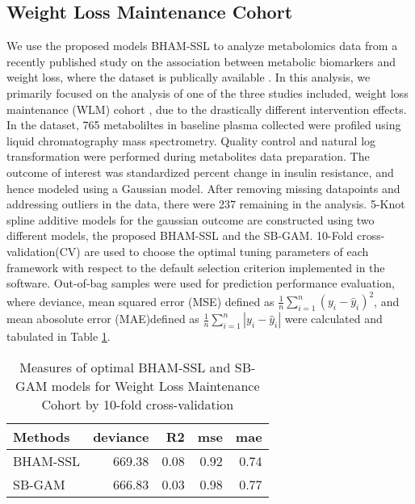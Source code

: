 \documentclass[AMA,STIX1COL,]{WileyNJD-v2}
\begin{document}
\hypertarget{weight-loss-maintenance-cohort}{%
\subsection{Weight Loss Maintenance
Cohort}\label{weight-loss-maintenance-cohort}}

We use the proposed models BHAM-SSL to analyze metabolomics data from a
recently published study \citep{Bihlmeyer2021} on the association
between metabolic biomarkers and weight loss, where the dataset is
publically available \citep{Bihlmeyer2021_data}. In this analysis, we
primarily focused on the analysis of one of the three studies included,
weight loss maintenance (WLM) cohort \citep{Svetkey2008}, due to the
drastically different intervention effects. In the dataset, 765
metaboliltes in baseline plasma collected were profiled using liquid
chromatography mass spectrometry. Quality control and natural log
transformation were performed during metabolites data preparation. The
outcome of interest was standardized percent change in insulin
resistance, and hence modeled using a Gaussian model. After removing
missing datapoints and addressing outliers in the data, there were 237
remaining in the analysis. 5-Knot spline additive models for the
gaussian outcome are constructed using two different models, the
proposed BHAM-SSL and the SB-GAM. 10-Fold cross-validation(CV) are used
to choose the optimal tuning parameters of each framework with respect
to the default selection criterion implemented in the software.
Out-of-bag samples were used for prediction performance evaluation,
where deviance, mean squared error (MSE) defined as
\(\frac{1}{n}\sum\limits^{n}_{i=1}(y_i - \hat y_i)^2\), and mean
abosolute error (MAE)defined as
\(\frac{1}{n}\sum\limits^{n}_{i=1}|y_i - \hat y_i|\) were calculated and
tabulated in Table \ref{tab:WLM_res}.

\begin{table}[ht]
\centering
\begin{tabular}{lrrrr}
  \hline
Methods & deviance & R2 & mse & mae \\ 
  \hline
BHAM-SSL & 669.38 & 0.08 & 0.92 & 0.74 \\ 
  SB-GAM & 666.83 & 0.03 & 0.98 & 0.77 \\ 
   \hline
\end{tabular}
\caption{Measures of optimal BHAM-SSL and SB-GAM models for Weight Loss Maintenance Cohort by 10-fold cross-validation} 
\label{tab:WLM_res}
\end{table}
\end{document}
